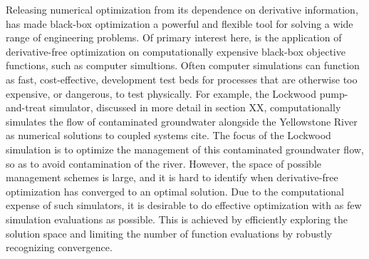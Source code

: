 \documentclass[12pt]{article}
\begin{document}
%
Releasing numerical optimization from its dependence on derivative information, has made black-box optimization a powerful and flexible tool for solving a wide range of engineering problems.
%
Of primary interest here, is the application of derivative-free optimization on computationally expensive black-box objective functions, such as computer simultions.
Often computer simulations can function as fast, cost-effective, development test beds for processes that are otherwise too expensive, or dangerous, to test physically. 
For example, the Lockwood pump-and-treat simulator, discussed in more detail in section {\color{red}XX}, computationally simulates the flow of contaminated groundwater alongside the Yellowstone River as numerical solutions to coupled systems {\color{red}cite}.
The focus of the Lockwood simulation is to optimize the management of this contaminated groundwater flow, so as to avoid contamination of the river.
However, the space of possible management schemes is large, and it is hard to identify when derivative-free optimization has converged to an optimal solution.
Due to the computational expense of such simulators, it is desirable to do effective optimization with as few simulation evaluations as possible.
This is achieved by efficiently exploring the solution space and limiting the number of function evaluations by robustly recognizing convergence.


%
%
\end{document}
